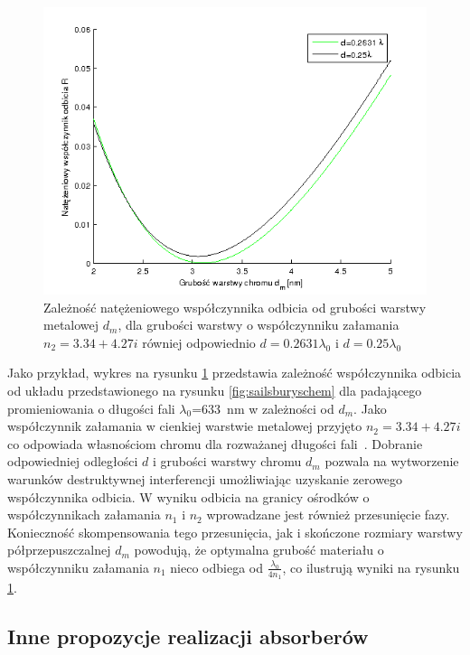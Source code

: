 \begin{figure}[tb]
	\centering
	\includegraphics[width=\textwidth]{images/pml/sailsbury-res.png}
	\caption{Zależność natężeniowego współczynnika odbicia od grubości warstwy metalowej $d_m$, dla grubości warstwy o współczynniku załamania $n_2=3.34 + 4.27i$ równiej odpowiednio $d=0.2631\lambda_0$ i $d=0.25\lambda_0$}
	\label{fig:sailsburyres}
\end{figure}

Jako przykład,  wykres na rysunku \ref{fig:sailsburyres}  przedstawia zależność współczynnika odbicia od układu przedstawionego na rysunku \ref{fig:sailsburyschem} dla padającego promieniowania o długości fali $\lambda_0$=633~nm w zależności od $d_m$. Jako współczynnik załamania w cienkiej warstwie metalowej przyjęto $n_2=3.34+4.27i$ co odpowiada własnościom chromu dla rozważanej długości fali~\cite{ordal1983optical}. Dobranie odpowiedniej odległości $d$ i grubości warstwy chromu $d_m$ pozwala na wytworzenie warunków destruktywnej interferencji umożliwiając uzyskanie zerowego współczynnika odbicia. W wyniku odbicia na granicy ośrodków o współczynnikach załamania $n_1$ i $n_2$ wprowadzane jest również przesunięcie fazy. Konieczność skompensowania tego przesunięcia, jak i skończone rozmiary warstwy półprzepuszczalnej $d_m$ powodują, że optymalna grubość materiału o współczynniku załamania $n_1$ nieco odbiega od $\frac{\lambda_0}{4 n_1}$, co ilustrują wyniki na rysunku \ref{fig:sailsburyres}. 

\subsection{Inne propozycje realizacji absorberów}

